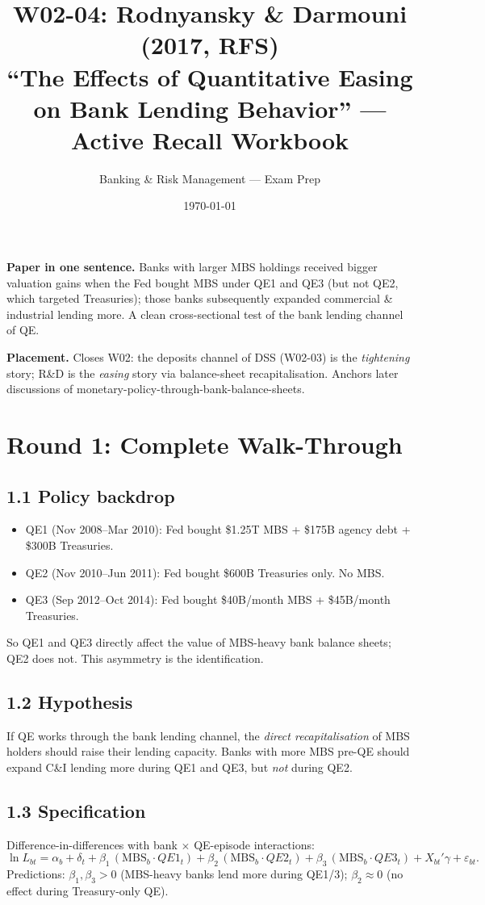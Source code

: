 \documentclass[11pt]{article}
\title{W02-04: Rodnyansky \& Darmouni (2017, RFS) \\
\large ``The Effects of Quantitative Easing on Bank Lending Behavior'' --- Active Recall Workbook}
\author{Banking \& Risk Management --- Exam Prep}
\date{\today}
\begin{document}
\maketitle

\begin{keybox}
\textbf{Paper in one sentence.} Banks with larger MBS holdings received bigger valuation gains when the Fed bought MBS under QE1 and QE3 (but not QE2, which targeted Treasuries); those banks subsequently expanded commercial \& industrial lending more. A clean cross-sectional test of the bank lending channel of QE.

\textbf{Placement.} Closes W02: the deposits channel of DSS (W02-03) is the \emph{tightening} story; R\&D is the \emph{easing} story via balance-sheet recapitalisation. Anchors later discussions of monetary-policy-through-bank-balance-sheets.
\end{keybox}

\section*{Round 1: Complete Walk-Through}

\subsection*{1.1 Policy backdrop}
\begin{itemize}
\item QE1 (Nov 2008--Mar 2010): Fed bought \$1.25T MBS + \$175B agency debt + \$300B Treasuries.
\item QE2 (Nov 2010--Jun 2011): Fed bought \$600B Treasuries only. No MBS.
\item QE3 (Sep 2012--Oct 2014): Fed bought \$40B/month MBS + \$45B/month Treasuries.
\end{itemize}
So QE1 and QE3 directly affect the value of MBS-heavy bank balance sheets; QE2 does not. This asymmetry is the identification.

\subsection*{1.2 Hypothesis}
If QE works through the bank lending channel, the \emph{direct recapitalisation} of MBS holders should raise their lending capacity. Banks with more MBS pre-QE should expand C\&I lending more during QE1 and QE3, but \emph{not} during QE2.

\subsection*{1.3 Specification}
Difference-in-differences with bank $\times$ QE-episode interactions:
\[
\ln L_{bt}=\alpha_b+\delta_t+\beta_1\,(\mathrm{MBS}_b\cdot QE1_t)+\beta_2\,(\mathrm{MBS}_b\cdot QE2_t)+\beta_3\,(\mathrm{MBS}_b\cdot QE3_t)+X_{bt}'\gamma+\varepsilon_{bt}.
\]
Predictions: $\beta_1,\beta_3>0$ (MBS-heavy banks lend more during QE1/3); $\beta_2\approx 0$ (no effect during Treasury-only QE).
\end{document}
